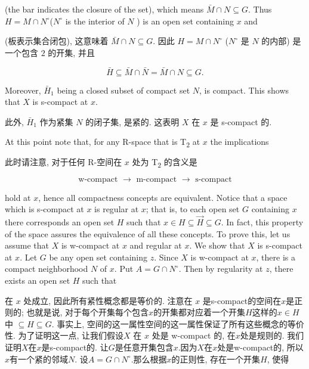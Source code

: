 \documentclass[options]{article}
\begin{document}
\begin{paracol}{2}
	\begin{en}
		(the bar indicates the closure of the set), which means $\bar{M} \cap N \subseteq G$. Thus $H=M \cap N^{\circ}$($N^{\circ}$ is the interior of $N$ ) is an open set containing $x$ and

	\end{en}
	\begin{cn}
		(板表示集合闭包), 这意味着 $\bar{M} \cap N \subseteq G$. 因此 $H=M \cap N^{\circ}$ ($N^{\circ}$ 是 $N$ 的内部) 是一个包含 $2$ 的开集, 并且
	\end{cn}
\end{paracol}
\[
		\bar{H} \subseteq \bar{M} \cap \bar{N}=\bar{M} \cap N \subseteq G .
\]
\begin{paracol}{2}

	\begin{en}
		Moreover, $\bar{H}_1$ being a closed subset of compact set $N$, is compact. This shows
		that $X$ is s-compact at $x$.
	\end{en}
	\begin{cn}
		此外, $\bar{H}_1$ 作为紧集 $N$ 的闭子集, 是紧的. 这表明	$X$ 在 $x$ 是 s-compact 的.
	\end{cn}
	\begin{en}
		At this point note that, for any R-space
		that is T\textsubscript{\!$2$} at $x$ the implications
	\end{en}
	\begin{cn}
		此时请注意, 对于任何 R-空间在 $x$ 处为 T\textsubscript{\!$2$} 的含义是
	\end{cn}
\end{paracol}
\[
		\text { w-compact } \longrightarrow \text { m-compact } \longrightarrow \text { s-compact }
\]
\begin{paracol}{2}
	\begin{en}
		\noindent
		hold at $x$, hence all compactness concepts are equivalent. Notice that a space which is
		s-compact at $x$ is regular at $x$; that is, to each open set $G$ containing $x$ there
		corresponds an open set $H$ such that $x \in H\subseteq \overrightarrow{H}\subseteq G$.
		In fact, this property of the space assures the equivalence of all these concepts. To
		prove this, let us assume that $X$ is w-compact at $x$ and regular at $x$. We show that
		$X$ is s-compact at $x$. Let $G$ be any open set containing $z$. Since $X$ is w-compact
		at $x$, there is a compact neighborhood $N$ of $x$. Put $A=G \cap N^{\circ}$. Then by
		regularity at $z$, there exists an open set $H$ such that
	\end{en}
	\begin{cn}
		\noindent
		在 $x$ 处成立, 因此所有紧性概念都是等价的. 注意在 $x$ 是s-compact的空间在$x$是正则的; 也就是说, 对于每个开集每个包含$x$的开集都对应着一个开集$H$这样的$x \in H$中 $\subseteq	H \subseteq G$. 事实上, 空间的这一属性空间的这一属性保证了所有这些概念的等价性. 为了证明这一点, 让我们假设$X$ 在 $x$ 处是 w-compact 的, 在$x$处是规则的. 我们证明$X$在$x$是s-compact的. 让$G$是任意开集包含$x$.因为$X$在$x$处是w-compact的, 所以$x$有一个紧的邻域$N$. 设$A=G\cap N^{\circ}$.那么根据$x$的正则性, 存在一个开集$H$, 使得
	\end{cn}
\end{paracol}
\end{document}
